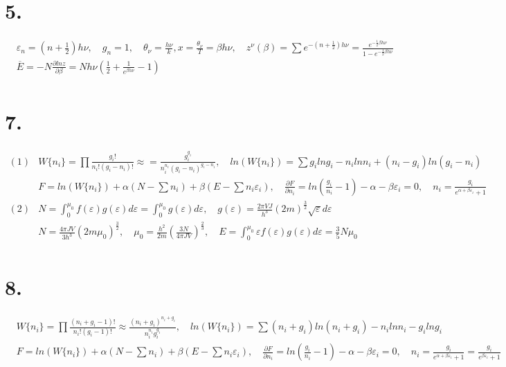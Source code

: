 \documentclass[UTF8]{ctexart}
\begin{document}
\section*{5.}
\begin{equation*}
  \begin{aligned}
     & \varepsilon_n=(n+\frac{1}{2})h\nu,\quad g_n=1,\quad\theta_\nu=\frac{h\nu}{k},
    x=\frac{\theta_\nu}{T}=\beta h\nu,\quad z^\nu(\beta)=\sum e^{-(n+\frac{1}{2})h\nu}
    =\frac{e^{-\frac{1}{2}\beta h\nu}}{1-e^{-\frac{1}{2}\beta h\nu}}                 \\
     & \overline{E}=-N\frac{\partial lnz}{\partial\beta}=Nh\nu(\frac{1}{2}+\frac{1}
    {e^{\beta h\nu}}-1)                                                              \\
  \end{aligned}
\end{equation*}
\section*{7.}
\begin{equation*}
  \begin{aligned}
    (1) & W\{n_i\}=\prod\frac{g_i!}{n_i!(g_i-n_i)!}\approx=\frac{g_i^{g_i}}{n_i^{n_i}(g_i
    -n_i)^{g_i-n_i}},\quad ln(W\{n_i\})=\sum g_ilng_i-n_ilnn_i+(n_i-g_i)ln(g_i-n_i)       \\
        & F=ln(W\{n_i\})+\alpha(N-\sum n_i)+\beta(E-\sum n_i\varepsilon_i),\quad\frac
    {\partial F}{\partial n_i}=ln(\frac{g_i}{n_i}-1)-\alpha-\beta\varepsilon_i=0,\quad
    n_i=\frac{g_i}{e^{\alpha+\beta\varepsilon_i}+1}                                       \\
    (2) & N=\int_0^{\mu_0}f(\varepsilon)g(\varepsilon)d\varepsilon=\int_0^{\mu_0}
    g(\varepsilon)d\varepsilon,\quad g(\varepsilon)=\frac{2\pi VJ}{h^3}(2m)^{\frac{3}
    {2}}\sqrt\varepsilon d\varepsilon                                                     \\
        & N=\frac{4\pi JV}{3h^3}(2m\mu_0)^{\frac{3}{2}},\quad\mu_0=\frac{h^2}{2m}(\frac
    {3N}{4\pi JV})^{\frac{2}{3}},\quad E=\int_0^{\mu_0}\varepsilon f(\varepsilon)g
    (\varepsilon)d\varepsilon=\frac{3}{5}N\mu_0                                           \\
  \end{aligned}
\end{equation*}
\section*{8.}
\begin{equation*}
  \begin{aligned}
     & W\{n_i\}=\prod\frac{(n_i+g_i-1)!}{n_i!(g_i-1)!}\approx\frac{(n_i+g_i)^{n_i+g_i}}
    {n_i^{n_i}g_i^{g_i}},\quad ln(W\{n_i\})=\sum(n_i+g_i)ln(n_i+g_i)-n_ilnn_i-g_ilng_i   \\
     & F=ln(W\{n_i\})+\alpha(N-\sum n_i)+\beta(E-\sum n_i\varepsilon_i),\quad\frac
    {\partial F}{\partial n_i}=ln(\frac{g_i}{n_i}-1)-\alpha-\beta\varepsilon_i=0,\quad
    n_i=\frac{g_i}{e^{\alpha+\beta\varepsilon_i}+1}=\frac{g_i}{e^{\beta\varepsilon_i}+1} \\
  \end{aligned}
\end{equation*}
\end{document}
